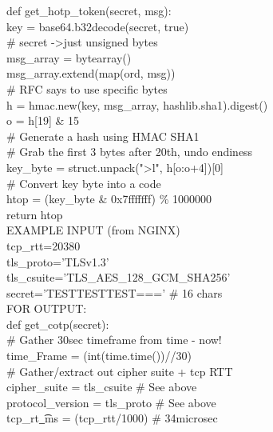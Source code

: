 \documentclass[a4paper, 11pt]{article} 				%
\begin{document}
\noindent
def get\_hotp\_token(secret, msg):\\
\indent key = base64.b32decode(secret, true)\\

\# secret -\textgreater just unsigned bytes\\
\indent msg\_array = bytearray()\\
\indent msg\_array.extend(map(ord, msg))\\

\# RFC says to use specific bytes\\
\indent h = hmac.new(key, msg\_array, hashlib.sha1).digest()\\
\indent o = h[19] \& 15\\

\# Generate a hash using HMAC SHA1\\
\indent \# Grab the first 3 bytes after 20th, undo endiness\\
\indent key\_byte = struct.unpack(">l", h[o:o+4])[0]\\
\indent \# Convert key byte into a code\\
\indent htop =  (key\_byte \& 0x7fffffff) \% 1000000\\
\indent return htop\\

\noindent
EXAMPLE INPUT (from NGINX)\\
\noindent
tcp\_rtt=20380\\
\noindent
tls\_proto='TLSv1.3'\\
\noindent
tls\_csuite='TLS\_AES\_128\_GCM\_SHA256'\\
\noindent
secret='TESTTESTTEST===' \# 16 chars\\

\noindent
FOR OUTPUT:\\
\noindent
def get\_cotp(secret):\\
\indent \# Gather 30sec timeframe from time - now!\\
\indent time\_Frame = (int(time.time())//30)\\
\indent \# Gather/extract out cipher suite + tcp RTT\\
\indent cipher\_suite = tls\_csuite 		         \# See above\\
\indent protocol\_version = tls\_proto		         \# See above\\
\indent tcp\_rt\t\_ms = (tcp\_rtt/1000)		         \# 34microsec\\      %
\end{document}
